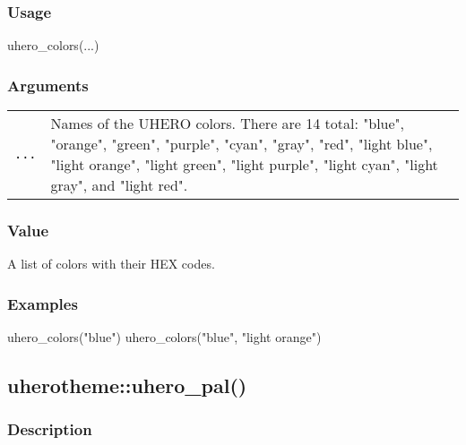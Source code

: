 \documentclass[
  letterpaper,
  DIV=11,
  numbers=noendperiod]{scrreport}
\newenvironment{Shaded}{\begin{snugshade}}{\end{snugshade}}
\newcommand{\FunctionTok}[1]{\textcolor[rgb]{0.28,0.35,0.67}{#1}}
\newcommand{\NormalTok}[1]{\textcolor[rgb]{0.00,0.23,0.31}{#1}}
\newcommand{\StringTok}[1]{\textcolor[rgb]{0.13,0.47,0.30}{#1}}
\begin{document}
\subsubsection{Usage}\label{usage-71}

\begin{Shaded}
\begin{Highlighting}[]
\FunctionTok{uhero\_colors}\NormalTok{(...)}
\end{Highlighting}
\end{Shaded}

\subsubsection{Arguments}\label{arguments-71}

\begin{longtable}[]{@{}ll@{}}
\toprule\noalign{}
\endhead
\bottomrule\noalign{}
\endlastfoot
\texttt{...} & Names of the UHERO colors. There are 14 total: "blue",
"orange", "green", "purple", "cyan", "gray", "red", "light blue", "light
orange", "light green", "light purple", "light cyan", "light gray", and
"light red". \\
\end{longtable}

\subsubsection{Value}\label{value-68}

A list of colors with their HEX codes.

\subsubsection{Examples}\label{examples-71}

\begin{Shaded}
\begin{Highlighting}[]
\FunctionTok{uhero\_colors}\NormalTok{(}\StringTok{"blue"}\NormalTok{)}
\FunctionTok{uhero\_colors}\NormalTok{(}\StringTok{"blue"}\NormalTok{, }\StringTok{"light orange"}\NormalTok{)}
\end{Highlighting}
\end{Shaded}

\subsection{uherotheme::uhero\_pal()}\label{uherothemeuhero_pal}

\subsubsection{Description}\label{description-72}
\end{document}
